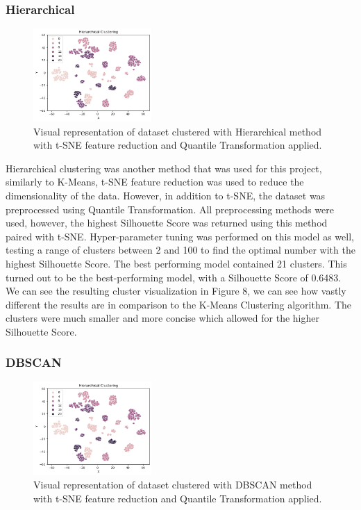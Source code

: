 \documentclass[twocolumn]{article}
\begin{document}
\subsubsection{Hierarchical}

\begin{figure}
    \centering
    \includegraphics[width=0.4\textwidth]{images/hierarchical.png}
    \caption{Visual representation of dataset clustered with Hierarchical method with t-SNE feature reduction and Quantile Transformation applied.}
\end{figure}

Hierarchical clustering was another method that was used for this project, similarly to K-Means, t-SNE feature reduction was used to reduce the dimensionality of the data. However, in addition to t-SNE, the dataset was preprocessed using Quantile Transformation. All preprocessing methods were used, however, the highest Silhouette Score was returned using this method paired with t-SNE. Hyper-parameter tuning was performed on this model as well, testing a range of clusters between 2 and 100 to find the optimal number with the highest Silhouette Score. The best performing model contained 21 clusters. This turned out to be the best-performing model, with a Silhouette Score of 0.6483. We can see the resulting cluster visualization in Figure 8, we can see how vastly different the results are in comparison to the K-Means Clustering algorithm. The clusters were much smaller and more concise which allowed for the higher Silhouette Score.


\subsubsection{DBSCAN}

\begin{figure}
    \centering
    \includegraphics[width=0.4\textwidth]{images/hierarchical.png}
    \caption{Visual representation of dataset clustered with DBSCAN method with t-SNE feature reduction and Quantile Transformation applied.}
\end{figure}
\end{document}
